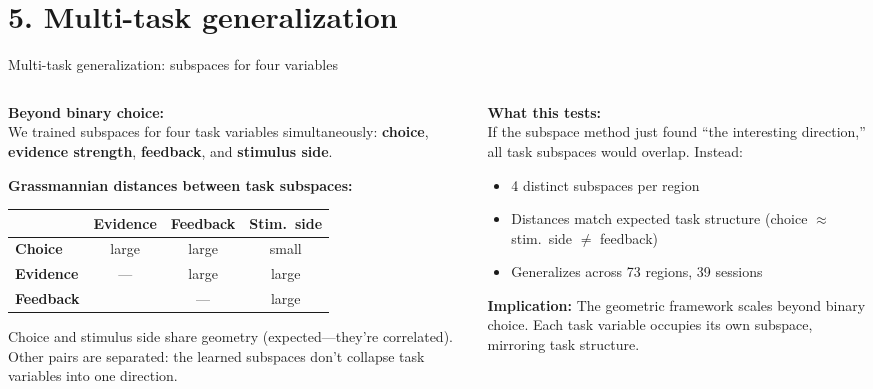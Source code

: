 \documentclass[aspectratio=169,11pt]{beamer}
\begin{document}
\section{5. Multi-task generalization}

\begin{frame}{Multi-task generalization: subspaces for four variables}
\begin{columns}[T]
\begin{column}{0.48\textwidth}
\textbf{Beyond binary choice:}\\[0.3em]
{\small We trained subspaces for four task variables simultaneously: \textbf{choice}, \textbf{evidence strength}, \textbf{feedback}, and \textbf{stimulus side}.}

\vspace{0.5em}
{\small \textbf{Grassmannian distances between task subspaces:}}\\[0.3em]
{\scriptsize
\begin{tabular}{lccc}
\toprule
 & \textbf{Evidence} & \textbf{Feedback} & \textbf{Stim.\ side} \\
\midrule
\textbf{Choice} & large & large & \textcolor{fail}{small} \\
\textbf{Evidence} & --- & large & large \\
\textbf{Feedback} & & --- & large \\
\bottomrule
\end{tabular}
}

\vspace{0.5em}
{\small Choice and stimulus side share geometry (expected---they're correlated). Other pairs are separated: the learned subspaces don't collapse task variables into one direction.}
\end{column}
\begin{column}{0.50\textwidth}
\textbf{What this tests:}\\[0.2em]
{\small If the subspace method just found ``the interesting direction,'' all task subspaces would overlap. Instead:}
\vspace{0.2em}
{\small
\begin{itemize}\setlength\itemsep{1pt}
  \item 4 distinct subspaces per region
  \item Distances match expected task structure (choice $\approx$ stim.\ side $\neq$ feedback)
  \item Generalizes across 73 regions, 39 sessions
\end{itemize}
}

\vspace{0.3em}
{\small \textbf{Implication:} The geometric framework scales beyond binary choice. Each task variable occupies its own subspace, mirroring task structure.}
\end{column}
\end{columns}
\end{frame}
\end{document}
